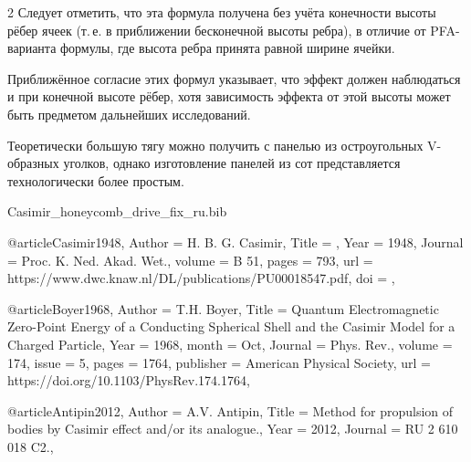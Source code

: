 \documentclass[twoside, 10pt]{article}
\def\myfilename{Casimir_honeycomb_drive_fix_ru}
\begin{document}
\begin{multicols}{2}
Следует отметить, что эта формула получена без учёта конечности высоты рёбер ячеек (т.\,е. в приближении бесконечной высоты ребра), в отличие от PFA-варианта формулы, где высота ребра принята равной ширине ячейки.

Приближённое согласие этих формул указывает, что эффект должен наблюдаться и при конечной высоте рёбер, хотя зависимость эффекта от этой высоты может быть предметом дальнейших исследований.

Теоретически большую тягу можно получить с панелью из остроугольных \mbox{V-образных} уголков, однако изготовление панелей из сот представляется технологически более простым.


\begin{filecontents}{\myfilename.bib}


@article{Casimir1948,
    Author = {H. B. G. Casimir},
    Title = {},
    Year = {1948},
    Journal = {Proc. K. Ned. Akad. Wet.},
    volume = {B 51},
    pages = {793},
    url = {https://www.dwc.knaw.nl/DL/publications/PU00018547.pdf},
    doi = {},
}


@article{Boyer1968,
    Author = {T.H. Boyer},
    Title = {Quantum Electromagnetic Zero-Point Energy of a Conducting Spherical Shell and the Casimir Model for a Charged Particle},
    Year = {1968},
    month = {Oct},
    Journal = {Phys. Rev.},
    volume = {174},
    issue = {5},
    pages = {1764},
    publisher = {American Physical Society},
    url = {https://doi.org/10.1103/PhysRev.174.1764},
}


@article{Antipin2012,
    Author = {A.V. Antipin},
    Title = {Method for propulsion of bodies by Casimir effect and/or its analogue.},
    Year = {2012},
    Journal = {RU 2 610 018 C2.},
}


\end{filecontents}
\end{multicols}
\end{document}
